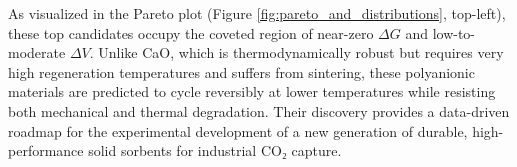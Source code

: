 \documentclass[]{article}
\begin{document}
As visualized in the Pareto plot (Figure \ref{fig:pareto_and_distributions}, top-left), these top candidates occupy the coveted region of near-zero $\Delta G$ and low-to-moderate $\Delta V$. Unlike CaO, which is thermodynamically robust but requires very high regeneration temperatures and suffers from sintering, these polyanionic materials are predicted to cycle reversibly at lower temperatures while resisting both mechanical and thermal degradation. Their discovery provides a data-driven roadmap for the experimental development of a new generation of durable, high-performance solid sorbents for industrial CO₂ capture.
\end{document}
